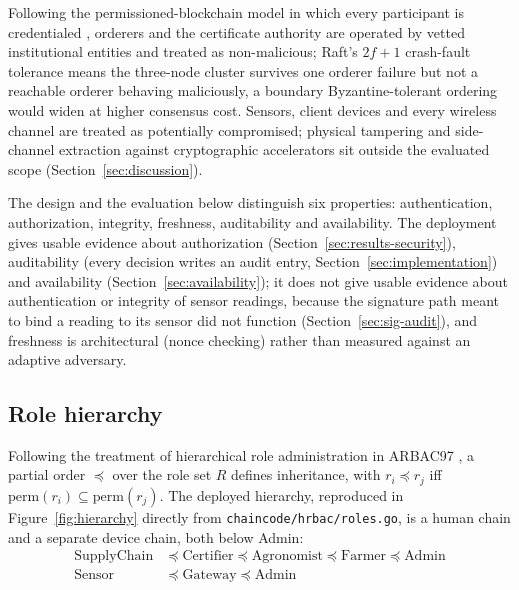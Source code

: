 Following the permissioned-blockchain model in which every participant is credentialed \citep{androulaki2018hyperledger}, orderers and the certificate authority are operated by vetted institutional entities and treated as non-malicious; Raft's $2f{+}1$ crash-fault tolerance \citep{ongaro2014search} means the three-node cluster survives one orderer failure but not a reachable orderer behaving maliciously, a boundary Byzantine-tolerant ordering \citep{yin2019hotstuff,castro1999practical,hyperledger2025v3} would widen at higher consensus cost. Sensors, client devices and every wireless channel are treated as potentially compromised; physical tampering and side-channel extraction against cryptographic accelerators sit outside the evaluated scope (Section~\ref{sec:discussion}).

The design and the evaluation below distinguish six properties: authentication, authorization, integrity, freshness, auditability and availability. The deployment gives usable evidence about authorization (Section~\ref{sec:results-security}), auditability (every decision writes an audit entry, Section~\ref{sec:implementation}) and availability (Section~\ref{sec:availability}); it does not give usable evidence about authentication or integrity of sensor readings, because the signature path meant to bind a reading to its sensor did not function (Section~\ref{sec:sig-audit}), and freshness is architectural (nonce checking) rather than measured against an adaptive adversary.

\subsection{Role hierarchy}
\label{sec:role-hierarchy}

Following the treatment of hierarchical role administration in ARBAC97 \citep{sandhu1999arbac97}, a partial order $\preceq$ over the role set $R$ defines inheritance, with $r_i \preceq r_j$ iff $\mathrm{perm}(r_i) \subseteq \mathrm{perm}(r_j)$. The deployed hierarchy, reproduced in Figure~\ref{fig:hierarchy} directly from \texttt{chaincode/hrbac/roles.go}, is a human chain and a separate device chain, both below Admin:
\begin{align}
\text{SupplyChain} &\preceq \text{Certifier} \preceq \text{Agronomist} \preceq \text{Farmer} \preceq \text{Admin} \\
\text{Sensor} &\preceq \text{Gateway} \preceq \text{Admin}
\end{align}

